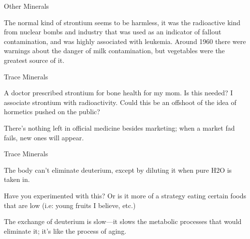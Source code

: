 \documentclass[11pt,oneside,openany,extrafontsizes]{memoir}
\begin{document}
\begin{standalonequote}{Other Minerals}

    \begin{answer}
        The normal kind of strontium seems to be harmless, it was the radioactive kind from nuclear bombs and industry that was used as an indicator of fallout contamination, and was highly associated with leukemia. Around 1960 there were warnings about the danger of milk contamination, but vegetables were the greatest source of it.
    \end{answer}
\end{standalonequote}

\begin{qaexchange}{Trace Minerals}

    \begin{question}
        A doctor prescribed strontium for bone health for my mom. Is this needed? I associate strontium with radioactivity. Could this be an offshoot of the idea of hormetics pushed on the public?
    \end{question}

    \begin{answer}
        There's nothing left in official medicine besides marketing; when a market fad fails, new ones will appear.
    \end{answer}
\end{qaexchange}

\begin{emailexchange}{Trace Minerals}

    \begin{answer}
        The body can't eliminate deuterium, except by diluting it when pure H2O is taken in.
    \end{answer}

    \begin{question}
        Have you experimented with this? Or is it more of a strategy eating certain foods that are low (i.e: young fruits I believe, etc.)
    \end{question}

    \begin{answer}
        The exchange of deuterium is slow—it slows the metabolic processes that would eliminate it; it's like the process of aging.
    \end{answer}
\end{emailexchange}
\end{document}
